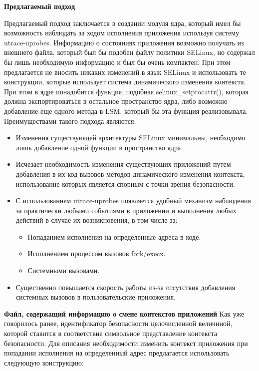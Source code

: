
\bigskip
{\bfseries Предлагаемый подход}

Предлагаемый подход заключается в создании 
модуля ядра, который имел бы возможность наблюдать
за ходом исполнения приложения используя систему 
utrace-uprobes. Информацию о состояниях приложения
возможно получать из внешнего файла, который был 
бы подобен файлу политики SELinux, но содержал бы
лишь необходимую информацию и был бы очень компактен. 
При этом предлагается не вносить никаких изменений 
в язык SELinux и использовать те конструкции, которые 
использует система динамического изменения контекста. 
При этом в ядре понадобится функция, подобная 
selinux\_setprocattr(), которая должна экспортироваться
в остальное пространство ядра, либо возможно добавление
еще одного метода в LSM, который бы эта функция 
реализовывала. Преимуществами такого подхода являются: 

\bigskip
\begin{itemize}
\item Изменения существующей архитектуры SELinux минимальны, 
необходимо лишь добавление одной функции в пространство ядра. 
\item Исчезает необходимость изменения существующих приложений
путем добавления в их код вызовов методов динамического 
изменения контекста, использование которых является спорным
с точки зрения безопасности. 
\item С использованием utrace-uprobes появляется удобный
механизм наблюдения за практически любыми событиями в 
приложении и выполнения любых действий в случае их 
возникновения, в том числе за:
	\begin{itemize}
	\item Попаданием исполнения на определенные 
	адреса в коде. 
	\item Исполнением процессом вызовов fork/execx.
	\item Системными вызовами. 
	\end{itemize}
\item Существенно повышается скорость работы из-за 
отсутствия добавления системных вызовов в пользовательские 
приложения. 
\end{itemize}

\bigskip
{\bfseries Файл, содержащий информацию о смене контекстов
приложений } 
Как уже говорилось ранее, идентификатор безопасности 
целочисленной величиной, которой ставится в соответствие 
символьное представление контекста безопасности. Для 
описания необходимости изменить контекст приложения 
при попадании исполнения на определенный адрес предлагается 
использовать следующую конструкцию: 

